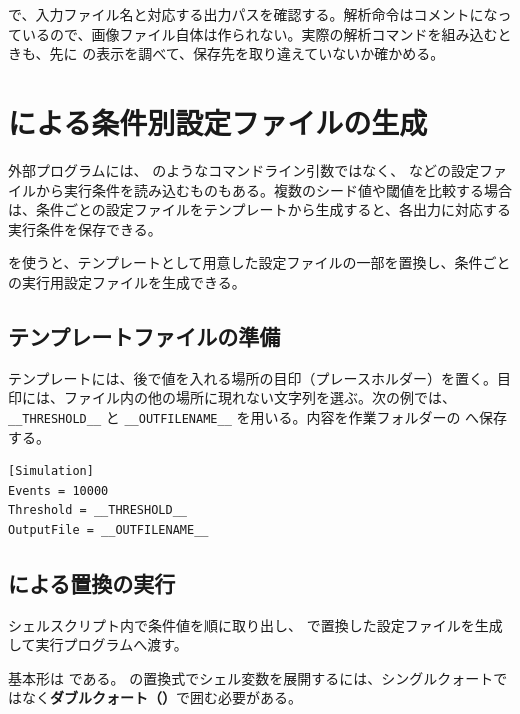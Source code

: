  で、入力ファイル名と対応する出力パスを確認する。解析命令はコメントになっているので、画像ファイル自体は作られない。実際の解析コマンドを組み込むときも、先に  の表示を調べて、保存先を取り違えていないか確かめる。

\section{ による条件別設定ファイルの生成}

外部プログラムには、 のようなコマンドライン引数ではなく、 などの設定ファイルから実行条件を読み込むものもある。複数のシード値や閾値を比較する場合は、条件ごとの設定ファイルをテンプレートから生成すると、各出力に対応する実行条件を保存できる。

 を使うと、テンプレートとして用意した設定ファイルの一部を置換し、条件ごとの実行用設定ファイルを生成できる。

\subsection{テンプレートファイルの準備}

テンプレートには、後で値を入れる場所の目印（プレースホルダー）を置く。目印には、ファイル内の他の場所に現れない文字列を選ぶ。次の例では、\verb|__THRESHOLD__| と \verb|__OUTFILENAME__| を用いる。内容を作業フォルダーの  へ保存する。

\begin{lstlisting}[numbers=none, title={config\_template.ini}]
[Simulation]
Events = 10000
Threshold = __THRESHOLD__
OutputFile = __OUTFILENAME__
\end{lstlisting}

\subsection{ による置換の実行}

シェルスクリプト内で条件値を順に取り出し、 で置換した設定ファイルを生成して実行プログラムへ渡す。

基本形は  である。 の置換式でシェル変数を展開するには、シングルクォートではなく\textbf{ダブルクォート（）}で囲む必要がある。

